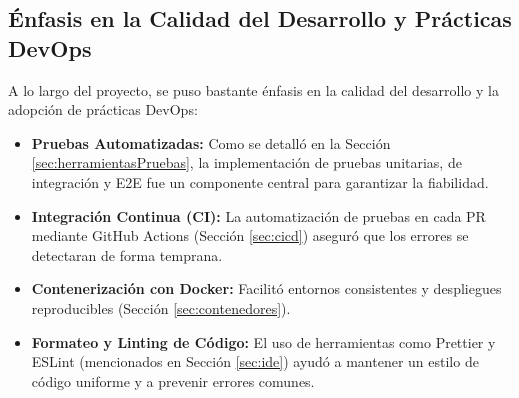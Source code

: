\subsection{Énfasis en la Calidad del Desarrollo y Prácticas DevOps}
\label{sec:calidadDevops}

A lo largo del proyecto, se puso bastante énfasis en la calidad del desarrollo y la adopción de prácticas DevOps:
    \begin{itemize}
        \item \textbf{Pruebas Automatizadas:} Como se detalló en la Sección \ref{sec:herramientasPruebas}, la implementación de pruebas unitarias, de integración y E2E fue un componente central para garantizar la fiabilidad.
        \item \textbf{Integración Continua (CI):} La automatización de pruebas en cada PR mediante GitHub Actions (Sección \ref{sec:cicd}) aseguró que los errores se detectaran de forma temprana.
        \item \textbf{Contenerización con Docker:} Facilitó entornos consistentes y despliegues reproducibles (Sección \ref{sec:contenedores}).
        \item \textbf{Formateo y Linting de Código:} El uso de herramientas como Prettier y ESLint (mencionados en Sección \ref{sec:ide}) ayudó a mantener un estilo de código uniforme y a prevenir errores comunes.
    \end{itemize}